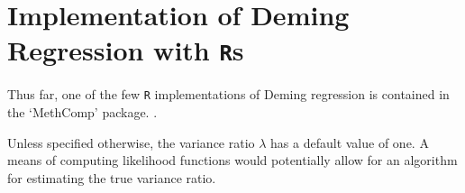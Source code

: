 \documentclass[MAIN.tex]{subfiles}
\begin{document}
	
	\section{Implementation of Deming Regression with \texttt{R}s}
	Thus far, one of the few \texttt{R} implementations of Deming regression is contained in the `MethComp' package. \citep{BXC2008}.
	
	Unless specified otherwise, the variance ratio $\lambda$ has a default value of one. A means of computing likelihood functions would potentially allow for an algorithm for estimating the true variance ratio.
	
	
	
	
	
	


\end{document}

